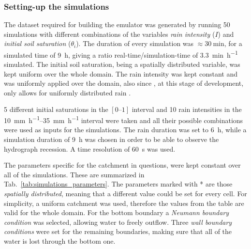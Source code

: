 \subsubsection{Setting-up the simulations}
The dataset required for building the emulator was generated by running \num{50} simulations with different combinations of the variables \emph{rain intensity} ($I$) and \emph{initial soil saturation} ($\theta_i$).
The duration of every simulation was $\approx \SI{30}{\minute}$, for a simulated time of \SI{9}{\hour}, giving a ratio real-time/simulation-time of \SI{3.3}{\minute\per\hour} simulated.
The initial soil saturation, being a spatially distributed variable, was kept uniform over the whole domain.
The rain intensity was kept constant and was uniformly applied over the domain, also since , at this stage of development, only allows for uniformly distributed rain \autocite{laguerre_documentation_2016}.

\num{5} different initial saturations in the $[\numrange{0}{1}]$ interval and \num{10} rain intensities in the \SIrange{10}{35}{\milli\metre\per\hour} interval were taken and all their possible combinations were used as inputs for the simulations.
The rain duration was set to \SI{6}{\hour}, while a simulation duration of \SI{9}{\hour} was chosen in order to be able to observe the hydrograph recession. A time resolution of \SI{60}{\second} was used.

The parameters specific for the catchment in questions, were kept constant over all of the simulations.
These are summarized in Tab.~\ref{tab:simulations_parameters}.
The parameters marked with * are those \emph{spatially distributed}, meaning that a different value could be set for every cell.
For simplicity, a uniform catchment was used, therefore the values from the table are valid for the whole domain.
For the bottom boundary a \textit{Neumann boundary condition} was selected, allowing water to freely outflow.
Three \textit{wall boundary conditions} were set for the remaining boundaries, making sure that all of the water is lost through the bottom one.

